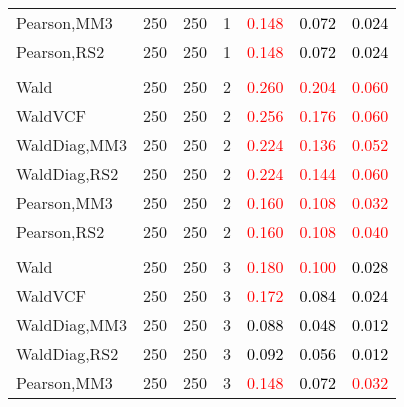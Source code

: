 \documentclass[
]{article}
\begin{document}
\begin{table}[H]
{\begin{tabular}[t]{lrrrrrr}
\hspace{1em}Pearson,MM3 & 250 & 250 & 1 & \textcolor{red}{0.148} & \textcolor{black}{0.072} & \textcolor{black}{0.024}\\
\hspace{1em}Pearson,RS2 & 250 & 250 & 1 & \textcolor{red}{0.148} & \textcolor{black}{0.072} & \textcolor{black}{0.024}\\
\addlinespace[0.3em]
\multicolumn{7}{l}{\textbf{1F 15V}}\\
\hspace{1em}Wald & 250 & 250 & 2 & \textcolor{red}{0.260} & \textcolor{red}{0.204} & \textcolor{red}{0.060}\\
\hspace{1em}WaldVCF & 250 & 250 & 2 & \textcolor{red}{0.256} & \textcolor{red}{0.176} & \textcolor{red}{0.060}\\
\hspace{1em}WaldDiag,MM3 & 250 & 250 & 2 & \textcolor{red}{0.224} & \textcolor{red}{0.136} & \textcolor{red}{0.052}\\
\hspace{1em}WaldDiag,RS2 & 250 & 250 & 2 & \textcolor{red}{0.224} & \textcolor{red}{0.144} & \textcolor{red}{0.060}\\
\hspace{1em}Pearson,MM3 & 250 & 250 & 2 & \textcolor{red}{0.160} & \textcolor{red}{0.108} & \textcolor{red}{0.032}\\
\hspace{1em}Pearson,RS2 & 250 & 250 & 2 & \textcolor{red}{0.160} & \textcolor{red}{0.108} & \textcolor{red}{0.040}\\
\addlinespace[0.3em]
\multicolumn{7}{l}{\textbf{2F 10V}}\\
\hspace{1em}Wald & 250 & 250 & 3 & \textcolor{red}{0.180} & \textcolor{red}{0.100} & \textcolor{black}{0.028}\\
\hspace{1em}WaldVCF & 250 & 250 & 3 & \textcolor{red}{0.172} & \textcolor{black}{0.084} & \textcolor{black}{0.024}\\
\hspace{1em}WaldDiag,MM3 & 250 & 250 & 3 & \textcolor{black}{0.088} & \textcolor{black}{0.048} & \textcolor{black}{0.012}\\
\hspace{1em}WaldDiag,RS2 & 250 & 250 & 3 & \textcolor{black}{0.092} & \textcolor{black}{0.056} & \textcolor{black}{0.012}\\
\hspace{1em}Pearson,MM3 & 250 & 250 & 3 & \textcolor{red}{0.148} & \textcolor{black}{0.072} & \textcolor{red}{0.032}\\

\end{tabular}}
\end{table}
\end{document}
